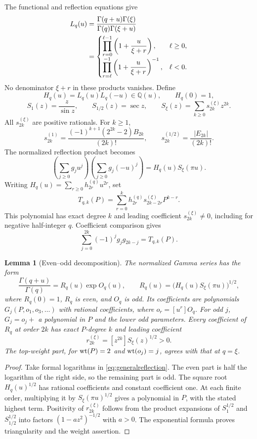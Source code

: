 \documentclass[11pt,a4paper]{article}
\newtheorem{lemma}[theorem]{Lemma}
\theoremstyle{definition}\newtheorem{definition}[theorem]{Definition}
\theoremstyle{remark}\newtheorem{remark}[theorem]{Remark}
\newcommand{\Q}{\mathbb Q}\newcommand{\Qb}{\overline{\mathbb Q}}
\begin{document}
The functional and reflection equations \cite{DLMF} give
\begin{align}\label{eq:Lq}
L_q(u)&=\frac{\Gamma(q+u)\Gamma(\xi)}{\Gamma(q)\Gamma(\xi+u)}\notag\\
&=\begin{cases}
\displaystyle\prod_{r=0}^{\ell-1}\left(1+\frac{u}{\xi+r}\right),&\ell\ge0,\\[4pt]
\displaystyle\prod_{r=\ell}^{-1}\left(1+\frac{u}{\xi+r}\right)^{-1},&\ell<0.
\end{cases}
\end{align}
No denominator $\xi+r$ in these products vanishes. Define
\[
H_q(u)=L_q(u)L_q(-u)\in\Q(u),\qquad H_q(0)=1,
\]
\[
S_1(z)=\frac{z}{\sin z},\qquad S_{1/2}(z)=\sec z,
\qquad S_\xi(z)=\sum_{k\ge0}s_{2k}^{(\xi)}z^{2k}.
\]
All $s_{2k}^{(\xi)}$ are positive rationals. For $k\ge1$,
\[
s_{2k}^{(1)}=\frac{(-1)^{k+1}(2^{2k}-2)B_{2k}}{(2k)!},\qquad
s_{2k}^{(1/2)}=\frac{|E_{2k}|}{(2k)!}.
\]
The normalized reflection product becomes
\begin{equation}\label{eq:generalreflection}
\left(\sum_{j\ge0}g_ju^j\right)
\left(\sum_{j\ge0}g_j(-u)^j\right)
=H_q(u)S_\xi(\pi u).
\end{equation}
Writing $H_q(u)=\sum_{r\ge0}h_{2r}^{(q)}u^{2r}$, set
\begin{equation}\label{eq:Tk}
T_{q,k}(P)=\sum_{r=0}^k h_{2r}^{(q)}s_{2k-2r}^{(\xi)}P^{k-r}.
\end{equation}
This polynomial has exact degree $k$ and leading coefficient $s_{2k}^{(\xi)}\ne0$, including for negative half-integer $q$. Coefficient comparison gives
\begin{equation}\label{eq:Qgeneral}
\sum_{j=0}^{2k}(-1)^jg_jg_{2k-j}=T_{q,k}(P).
\end{equation}

\begin{lemma}[Even--odd decomposition]\label{lem:structure}
The normalized Gamma series has the form
\[
\frac{\Gamma(q+u)}{\Gamma(q)}=R_q(u)\exp O_q(u),\qquad
R_q(u)=\bigl(H_q(u)S_\xi(\pi u)\bigr)^{1/2},
\]
where $R_q(0)=1$, $R_q$ is even, and $O_q$ is odd. Its coefficients are polynomials $G_j(P,o_1,o_3,\ldots)$ with rational coefficients, where $o_r=[u^r]O_q$. For odd $j$, $G_j=o_j+$ a polynomial in $P$ and the lower odd parameters. Every coefficient of $R_q$ at order $2k$ has exact $P$-degree $k$ and leading coefficient
\[
r_{2k}^{(\xi)}=[z^{2k}]S_\xi(z)^{1/2}>0.
\]
The top-weight part, for $\operatorname{wt}(P)=2$ and $\operatorname{wt}(o_j)=j$, agrees with that at $q=\xi$.
\end{lemma}
\begin{proof}
Take formal logarithms in \eqref{eq:generalreflection}. The even part is half the logarithm of the right side, so the remaining part is odd. The square root $H_q(u)^{1/2}$ has rational coefficients and constant coefficient one. At each finite order, multiplying it by $S_\xi(\pi u)^{1/2}$ gives a polynomial in $P$, with the stated highest term. Positivity of $r_{2k}^{(\xi)}$ follows from the product expansions of $S_1^{1/2}$ and $S_{1/2}^{1/2}$ into factors $(1-a z^2)^{-1/2}$ with $a>0$. The exponential formula proves triangularity and the weight assertion.
\end{proof}
\end{document}
